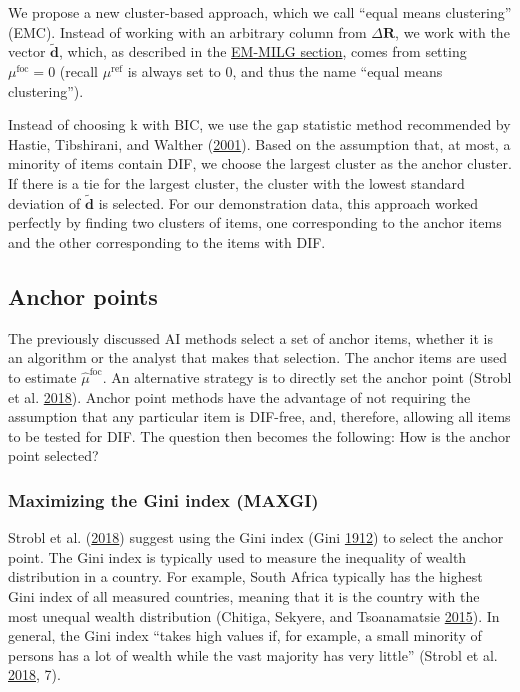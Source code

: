 \documentclass[
  11pt,
]{article}
\begin{document}
We propose a new cluster-based approach, which we call \enquote{equal means clustering} (EMC). Instead of working with an arbitrary column from \(\Delta \mathbf{R}\), we work with the vector \(\tilde{\mathbf{d}}\), which, as described in the \protect\hyperlink{emmilg}{EM-MILG section}, comes from setting \(\mu^\text{foc} = 0\) (recall \(\mu^\text{ref}\) is always set to \(0\), and thus the name \enquote{equal means clustering}).

Instead of choosing k with BIC, we use the gap statistic method recommended by Hastie, Tibshirani, and Walther (\protect\hyperlink{ref-hastie2001estimating}{2001}). Based on the assumption that, at most, a minority of items contain DIF, we choose the largest cluster as the anchor cluster. If there is a tie for the largest cluster, the cluster with the lowest standard deviation of \(\tilde{\mathbf{d}}\) is selected. For our demonstration data, this approach worked perfectly by finding two clusters of items, one corresponding to the anchor items and the other corresponding to the items with DIF.

\hypertarget{anchor-points}{%
\subsection{Anchor points}\label{anchor-points}}

The previously discussed AI methods select a set of anchor items, whether it is an algorithm or the analyst that makes that selection. The anchor items are used to estimate \(\hat \mu^\text{foc}\). An alternative strategy is to directly set the anchor point (Strobl et al. \protect\hyperlink{ref-strobl2018anchor}{2018}). Anchor point methods have the advantage of not requiring the assumption that any particular item is DIF-free, and, therefore, allowing all items to be tested for DIF. The question then becomes the following: How is the anchor point selected?

\hypertarget{maximizing-the-gini-index-maxgi}{%
\subsubsection{Maximizing the Gini index (MAXGI)}\label{maximizing-the-gini-index-maxgi}}

Strobl et al. (\protect\hyperlink{ref-strobl2018anchor}{2018}) suggest using the Gini index (Gini \protect\hyperlink{ref-gini1912variabilita}{1912}) to select the anchor point. The Gini index is typically used to measure the inequality of wealth distribution in a country. For example, South Africa typically has the highest Gini index of all measured countries, meaning that it is the country with the most unequal wealth distribution (Chitiga, Sekyere, and Tsoanamatsie \protect\hyperlink{ref-chitiga2015income}{2015}). In general, the Gini index \enquote{takes high values if, for example, a small minority of persons has a lot of wealth while the vast majority has very little} (Strobl et al. \protect\hyperlink{ref-strobl2018anchor}{2018}, 7).
\end{document}
